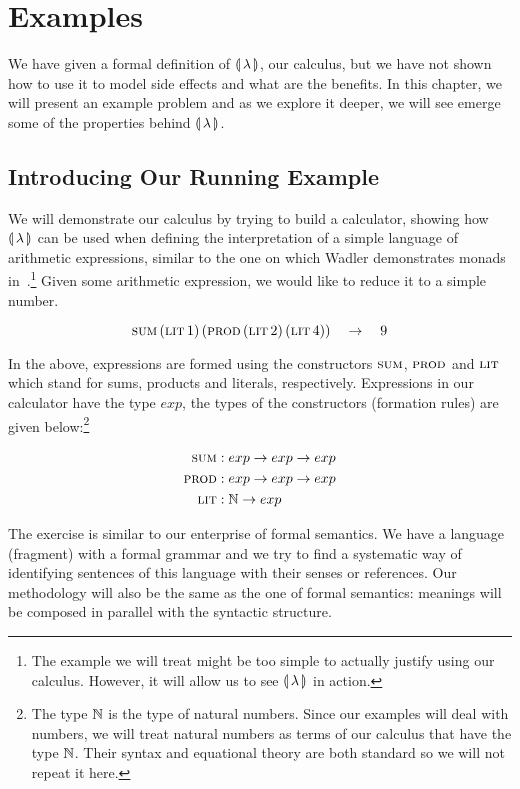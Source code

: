 \chapter{Examples}
\label{chap:examples}

We have given a formal definition of ${\llparenthesis \, \lambda \, \rrparenthesis}$, our calculus, but we have not
shown how to use it to model side effects and what are the benefits. In
this chapter, we will present an example problem and as we explore it
deeper, we will see emerge some of the properties behind ${\llparenthesis \, \lambda \, \rrparenthesis}$.

\minitoc


\section{Introducing Our Running Example}

We will demonstrate our calculus by trying to build a calculator, showing
how ${\llparenthesis \, \lambda \, \rrparenthesis}$ can be used when defining the interpretation of a simple
language of arithmetic expressions, similar to the one on which Wadler
demonstrates monads in~\cite{wadler1992essence}.\footnote{The example we
  will treat might be too simple to actually justify using our
  calculus. However, it will allow us to see ${\llparenthesis \, \lambda \, \rrparenthesis}$ in action.}  Given
some arithmetic expression, we would like to reduce it to a simple number.

$$
\textsc{sum}\,(\textsc{lit}\,1)\,(\textsc{prod}\,(\textsc{lit}\,2)\,(\textsc{lit}\,4))
\quad \to \quad 9
$$

In the above, expressions are formed using the constructors $\textsc{sum}$,
$\textsc{prod}$ and $\textsc{lit}$ which stand for sums, products and literals,
respectively. Expressions in our calculator have the type $exp$, the types
of the constructors (formation rules) are given below:\footnote{The type
  $\mathbb{N}$ is the type of natural numbers. Since our examples will deal with
  numbers, we will treat natural numbers as terms of our calculus that have
  the type $\mathbb{N}$. Their syntax and equational theory are both standard so
  we will not repeat it here.}

\begin{align*}
  \textsc{sum} &: exp \to exp \to exp \\
  \textsc{prod} &: exp \to exp \to exp \\
  \textsc{lit} &: \mathbb{N} \to exp
\end{align*}

The exercise is similar to our enterprise of formal semantics. We have a
language (fragment) with a formal grammar and we try to find a systematic
way of identifying sentences of this language with their senses or
references. Our methodology will also be the same as the one of formal
semantics: meanings will be composed in parallel with the syntactic
structure.

